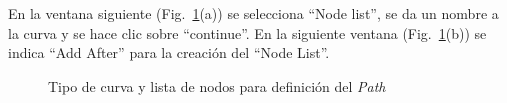 \documentclass[spanish,a4paper,12pt]{article}
\begin{document}
\begin{enumerate}
En la ventana siguiente (Fig.~\ref{fig13}(a)) se selecciona ``Node list'', se da un nombre a la curva y se hace clic sobre ``continue''.
En la siguiente ventana (Fig.~\ref{fig13}(b)) se indica ``Add After'' para la creación del ``Node List''.
\begin{figure}[!htp]
\centering
	\quad
\caption{Tipo de curva y lista de nodos para definición del \emph{Path}}
\label{fig13}
\end{figure}


\end{enumerate}
\end{document}
